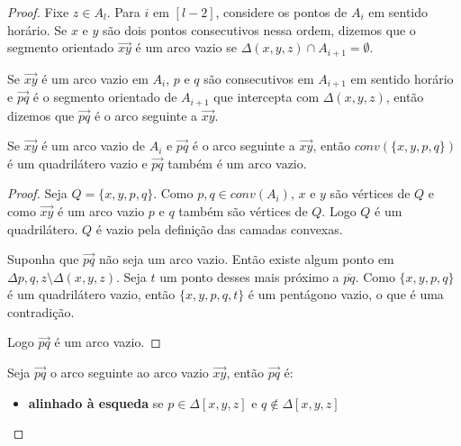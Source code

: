 \begin{proof}
    Fixe $z\in A_l$. Para $i$ em $[l-2]$, considere os pontos de $A_i$ em sentido horário. Se $x$ e $y$ são dois pontos consecutivos nessa ordem, dizemos que o segmento orientado $\overrightarrow{xy}$ é um arco vazio se $\Delta (x,y,z)\cap A_{i+1}=\emptyset$.

    Se $\overrightarrow{xy}$ é um arco vazio em $A_i$, $p$ e $q$ são consecutivos em $A_{i+1}$ em sentido horário e $\overrightarrow{pq}$ é o segmento orientado de $A_{i+1}$ que intercepta com $\Delta(x,y,z)$, então dizemos que $\overrightarrow{pq}$ é o arco seguinte a $\overrightarrow{xy}$.


    \begin{fato}\label{fato1}
        Se $\overrightarrow{xy}$ é um arco vazio de $A_i$ e $\overrightarrow{pq}$ é o arco seguinte a $\overrightarrow{xy}$, então $conv(\{x,y,p,q\})$ é um quadrilátero vazio e $\overrightarrow{pq}$ também é um arco vazio.
    \end{fato}
    \begin{proof}
        Seja $Q=\{x,y,p,q\}$. Como $p,q\in conv(A_i)$, $x$ e $y$ são vértices de $Q$ e como $\overrightarrow{xy}$ é um arco vazio $p$ e $q$ também são vértices de $Q$. Logo $Q$ é um quadrilátero. $Q$ é vazio pela definição das camadas convexas.

        Suponha que $\overrightarrow{pq}$ não seja um arco vazio. Então existe algum ponto em $\Delta{p,q,z}\setminus\Delta(x,y,z)$. Seja $t$ um ponto desses mais próximo a $\overline{pq}$. Como $\{x,y,p,q\}$ é um quadrilátero vazio, então $\{x,y,p,q,t\}$ é um pentágono vazio, o que é uma contradição.

        Logo $\overrightarrow{pq}$ é um arco vazio.
    \end{proof}

    Seja $\overrightarrow{pq}$ o arco seguinte ao arco vazio $\overrightarrow{xy}$, então $\overrightarrow{pq}$ é:
    \begin{itemize}
        \item \textbf{alinhado à esqueda} se $p\in\Delta[x,y,z]$ e $q\notin\Delta[x,y,z]$


\end{itemize}
\end{proof}
